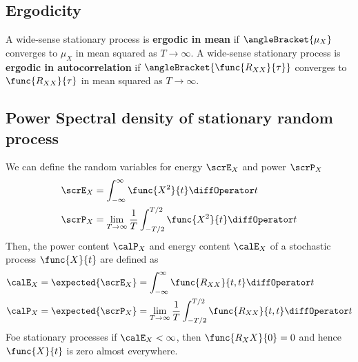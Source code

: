 \subsection{Ergodicity}
A wide-sense stationary process is \textbf{ergodic in mean} if \(\angleBracket{\mu_X}\) converges to \(\mu_X\) in mean squared as \(T \to \infty\).
A wide-sense stationary process is \textbf{ergodic in autocorrelation} if \(\angleBracket{\func{R_{XX}}{\tau}}\) converges to \(\func{R_{XX}}{\tau}\) in mean squared as \(T \to \infty\).

\subsection{Power Spectral density of stationary random process}
We can define the random variables for energy \(\scrE_X\) and power \(\scrP_X\) 
\begin{align*}
    \scrE_X &= \int_{-\infty}^{\infty} \func{X^2}{t} \diffOperator t\\
    \scrP_X &= \lim_{T \to \infty} \dfrac{1}{T} \int_{-T/2}^{T/2} \func{X^2}{t} \diffOperator t
\end{align*}
Then, the power content \(\calP_X\) and energy content \(\calE_X\) of a stochastic process \(\func{X}{t}\) are defined as 
\begin{align*}
    \calE_X &= \expected{\scrE_X} = \int_{-\infty}^{\infty} \func{R_{XX}}{t,t} \diffOperator t\\
    \calP_X &= \expected{\scrP_X} =  \lim_{T \to \infty} \dfrac{1}{T} \int_{-T/2}^{T/2} \func{R_{XX}}{t,t} \diffOperator t
\end{align*}
Foe stationary processes if \(\calE_X < \infty\), then \(\func{R_XX}{0} = 0\) and hence \(\func{X}{t}\) is zero almost everywhere.

